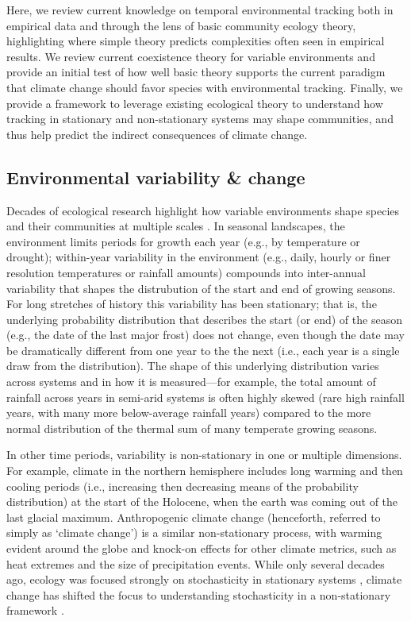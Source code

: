 \documentclass[11pt,letterpaper]{article}
\begin{document}
Here, we review current knowledge on temporal environmental tracking both in empirical data and through the lens of basic community ecology theory, highlighting where simple theory predicts complexities often seen in empirical results. We review current coexistence theory for variable environments and provide an initial test of how well basic theory supports the current paradigm that climate change should favor species with environmental tracking. Finally, we provide a framework to leverage existing ecological theory to understand how tracking in stationary and non-stationary systems may shape communities, and thus help predict the indirect consequences of climate change. 

\subsection{Environmental variability \& change}

Decades of ecological research highlight how variable environments shape species and their communities at multiple scales \citep{Sale:1977oq,Chesson:1997dz}.  In seasonal landscapes, the environment limits periods for growth each year (e.g., by temperature or drought); within-year variability in the environment (e.g., daily, hourly or finer resolution temperatures or rainfall amounts) compounds into inter-annual variability that shapes the distrubution of the start and end of growing seasons. For long stretches of history this variability has been stationary; that is, the underlying probability distribution that describes the start (or end) of the season (e.g., the date of the last major frost) does not change, even though the date may be dramatically different from one year to the the next (i.e., each year is a single draw from the distribution). The shape of this underlying distribution varies across systems and in how it is measured---for example, the total amount of rainfall across years in semi-arid systems is often highly skewed (rare high rainfall years, with many more below-average rainfall years) compared to the more normal distribution of the thermal sum of many temperate growing seasons. 

In other time periods, variability is non-stationary in one or multiple dimensions. For example, climate in the northern hemisphere includes long warming and then cooling periods (i.e., increasing then decreasing means of the probability distribution) at the start of the Holocene, when the earth was coming out of the last glacial maximum. Anthropogenic climate change (henceforth, referred to simply as `climate change') is a similar non-stationary process, with warming evident around the globe and knock-on effects for other climate metrics, such as heat extremes and the size of precipitation events. While only several decades ago, ecology was focused strongly on stochasticity in stationary systems \citep[e.g.,][]{Ripa1996,Kaitala1997}, climate change has shifted the focus to understanding stochasticity in a non-stationary framework \citep[e.g.,][]{cazwavelets,ehrlen2016}.
\end{document}

